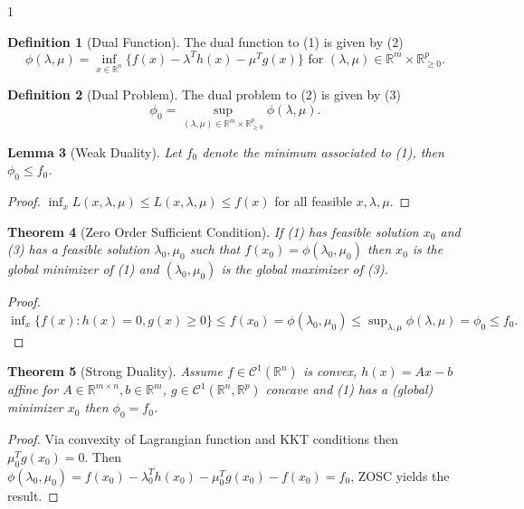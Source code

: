 \documentclass[12pt]{article}
\newtheorem{theorem}{Theorem}[section]
\newtheorem{lemma}[theorem]{Lemma}
\theoremstyle{definition}
\newtheorem{definition}[theorem]{Definition}
\theoremstyle{plain}
\begin{document}
\begin{spacing}{1}
{\begin{definition}[Dual Function]
    The dual function to (1) is given by (2)
    \[
    \phi(\lambda, \mu) = \inf_{x \in \mathbb{R}^n} \{f(x) - \lambda^T h(x) - \mu^T g(x)\} \text{ for } (\lambda, \mu) \in \mathbb{R}^m \times \mathbb{R}^p_{\geq 0}.
    \]
\end{definition}

\begin{definition}[Dual Problem]
    The dual problem to (2) is given by (3)
    \[
    \phi_0 = \sup_{(\lambda, \mu) \in \mathbb{R}^m \times \mathbb{R}^p_{\geq 0}} \phi(\lambda, \mu).
    \]
\end{definition}

\begin{lemma}[Weak Duality]
    Let $f_0$ denote the minimum associated to (1), then $\phi_0 \leq f_0$.
\end{lemma}

\begin{proof}
    $\inf_{x} L(x, \lambda, \mu) \leq L(x, \lambda, \mu) \leq f(x)$ for all feasible $x, \lambda, \mu$.
\end{proof}

\begin{theorem}[Zero Order Sufficient Condition]
    If (1) has feasible solution $x_0$ and (3) has a feasible solution $\lambda_0, \mu_0$ such that $f(x_0) = \phi(\lambda_0, \mu_0)$ then $x_0$ is the global minimizer of (1) and $(\lambda_0, \mu_0)$ is the global maximizer of (3). 
\end{theorem}

\begin{proof}
    $\inf_{x} \{f(x): h(x) = 0, g(x) \geq 0\} \leq f(x_0) = \phi(\lambda_0, \mu_0) \leq \sup_{\lambda, \mu} \phi(\lambda, \mu) = \phi_0 \leq f_0.$
\end{proof}

\begin{theorem}[Strong Duality]
    Assume $f \in \mathcal{C}^1(\mathbb{R}^n)$ is convex, $h(x) = Ax - b$ affine for $A \in \mathbb{R}^{m \times n}, b \in \mathbb{R}^m$, $g \in \mathcal{C}^1(\mathbb{R}^n, \mathbb{R}^p)$ concave and (1) has a (global) minimizer $x_0$ then $\phi_0 = f_0$.
\end{theorem}

\begin{proof}
    Via convexity of Lagrangian function and KKT conditions then $\mu_0^T g(x_0) = 0$. Then $\phi(\lambda_0, \mu_0) = f(x_0) - \lambda_0^T h(x_0) - \mu_0^Tg(x_0) - f(x_0) = f_0$, ZOSC yields the result.
\end{proof}

}
\end{spacing}
\end{document}
